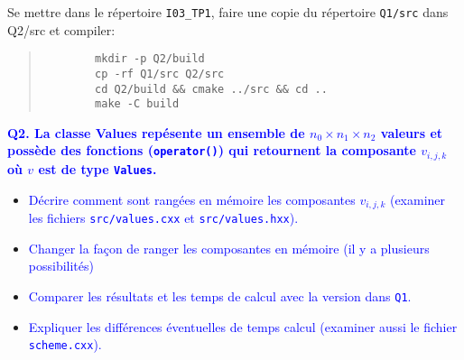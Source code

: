 \documentclass{beamer}
\begin{document}
\begin{frame}[fragile]
	\vfill
	Se mettre dans le r\'epertoire {\tt I03\_TP1}, faire une copie du r\'epertoire {\tt Q1/src} dans {Q2/src} et compiler:
	\begin{quote}
		\begin{verbatim}
		mkdir -p Q2/build
		cp -rf Q1/src Q2/src
		cd Q2/build && cmake ../src && cd ..
		make -C build
		\end{verbatim}
	\end{quote}

	\vfill
	\textcolor{blue}{\bf Q2. La classe {Values} rep\'esente un ensemble de $n_0 \times n_1 \times n_2$ valeurs et poss\`ede des fonctions ({\tt operator()}) qui retournent la composante $v_{i,j,k}$ o\`u $v$ est de type {\tt Values}.}
	
	\begin{itemize}
		\item \textcolor{blue}{D\'ecrire comment sont rang\'ees en m\'emoire les composantes $v_{i,j,k}$
		(examiner les fichiers {\tt src/values.cxx} et {\tt src/values.hxx}).}
		\item \textcolor{blue}{Changer la fa\c{c}on de ranger les composantes en m\'emoire (il y a plusieurs possibilit\'es)}
		\item \textcolor{blue}{Comparer les r\'esultats et les temps de calcul avec la version dans {\tt Q1}.}
		\item \textcolor{blue}{Expliquer les diff\'erences \'eventuelles de temps calcul (examiner aussi le fichier {\tt scheme.cxx}).}
	\end{itemize}
	 
\end{frame}
\end{document}
